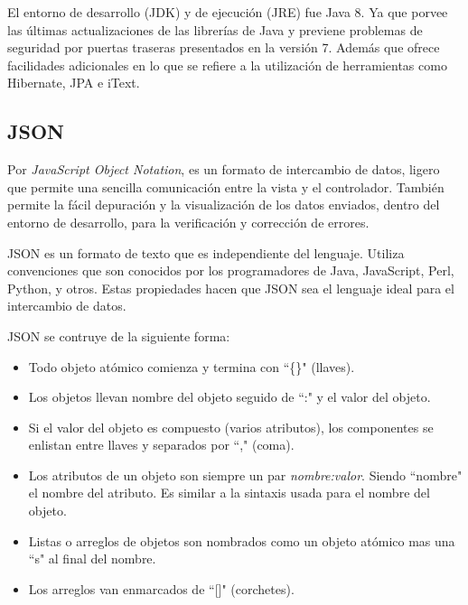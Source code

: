         El entorno de desarrollo (JDK) y de ejecución (JRE) fue Java 8. Ya que porvee las últimas actualizaciones de las librerías de Java y previene problemas de seguridad por puertas traseras presentados en la versión 7. Además que ofrece facilidades adicionales en lo que se refiere a la utilización de herramientas como Hibernate, JPA e iText.
        
        \subsection{JSON}
        \label{tecno-json}
        
        Por \textit{JavaScript Object Notation}, es un formato de intercambio de datos, ligero\cite{JSON-yahoo} que permite una sencilla comunicación entre la vista y el controlador. También permite la fácil depuración y la visualización de los datos enviados, dentro del entorno de desarrollo, para la verificación y corrección de errores.
        
        JSON es un formato de texto que es independiente del lenguaje. Utiliza convenciones que son  conocidos por los programadores de Java, JavaScript, Perl, Python, y otros. Estas propiedades hacen que JSON sea el lenguaje ideal para el intercambio de datos\cite{JSON-jsonOrg}.
        
        JSON se contruye de la siguiente forma:
        
        \begin{itemize}
            \item Todo objeto atómico comienza y termina con ``\{\}" (llaves).
            \item Los objetos llevan nombre del objeto seguido de ``:" y el valor del objeto.
            \item Si el valor del objeto es compuesto (varios atributos), los componentes se enlistan entre llaves y separados por ``," (coma).
            \item Los atributos de un objeto son siempre un par \textit{nombre:valor}. Siendo ``nombre" el nombre del atributo. Es similar a la sintaxis usada para el nombre del objeto.
            \item Listas o arreglos de objetos son nombrados como un objeto atómico mas una ``s" al final del nombre.
            \item Los arreglos van enmarcados de ``[]" (corchetes).
        \end{itemize}
        
